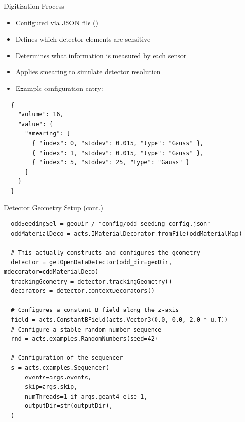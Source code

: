 \documentclass[lualatex,aspectratio=169,t,13pt,dvipsnames]{beamer}
\begin{document}
\begin{frame}[fragile,c]{Digitization Process}
  \begin{itemize}
    \item Configured via JSON file ()
    \item Defines which detector elements are sensitive
    \item Determines what information is measured by each sensor
    \item Applies smearing to simulate detector resolution
    \item Example configuration entry:
  \end{itemize}
  
  \begin{verbatim}
  {
    "volume": 16,
    "value": {
      "smearing": [
        { "index": 0, "stddev": 0.015, "type": "Gauss" },
        { "index": 1, "stddev": 0.015, "type": "Gauss" },
        { "index": 5, "stddev": 25, "type": "Gauss" }
      ]
    }
  }
  \end{verbatim}
\end{frame}



\begin{frame}[fragile]{Detector Geometry Setup (cont.)}
  \begin{verbatim}
  oddSeedingSel = geoDir / "config/odd-seeding-config.json"
  oddMaterialDeco = acts.IMaterialDecorator.fromFile(oddMaterialMap)

  # This actually constructs and configures the geometry
  detector = getOpenDataDetector(odd_dir=geoDir, mdecorator=oddMaterialDeco)
  trackingGeometry = detector.trackingGeometry()
  decorators = detector.contextDecorators()

  # Configures a constant B field along the z-axis
  field = acts.ConstantBField(acts.Vector3(0.0, 0.0, 2.0 * u.T))
  # Configure a stable random number sequence
  rnd = acts.examples.RandomNumbers(seed=42)

  # Configuration of the sequencer
  s = acts.examples.Sequencer(
      events=args.events,
      skip=args.skip,
      numThreads=1 if args.geant4 else 1,
      outputDir=str(outputDir),
  )
  \end{verbatim}
\end{frame}
\end{document}
